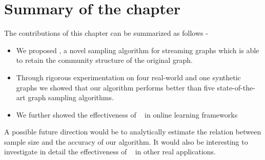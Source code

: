 

\section{Summary of the chapter}
The contributions of this chapter can be summarized as follows - 
\begin{itemize}
 \item We proposed \compas, a novel sampling algorithm for streaming graphs 
which is able to retain the community structure of the original graph.
 \item Through rigorous experimentation on four real-world and one synthetic graphs we showed that our algorithm performs better than 
five state-of-the-art graph sampling algorithms.
 \item We further showed the effectiveness of \compas~ in online learning frameworks
\end{itemize}
  
A possible future direction would be to analytically estimate the relation between sample size and the accuracy of our algorithm. 
It would also be interesting to investigate in detail the effectiveness of \compas~ in other real applications. 

